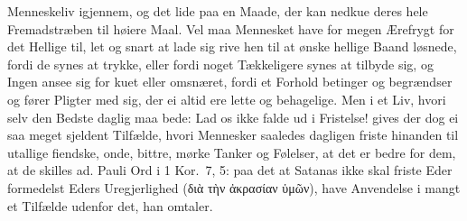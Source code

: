 \documentclass[12pt,a4paper]{book}
\begin{document}
Menneskeliv igjennem, og det lide paa en Maade, der kan nedkue deres
hele Fremadstræben til høiere Maal. Vel maa Mennesket have for megen
Ærefrygt for det Hellige til, let og snart at lade sig rive hen til at
ønske hellige Baand løsnede, fordi de synes at trykke, eller fordi noget
Tækkeligere synes at tilbyde sig, og Ingen ansee sig for kuet eller
omsnæret, fordi et Forhold betinger og begrændser og fører Pligter med
sig, der ei altid ere lette og behagelige. Men i et Liv, hvori selv den
Bedste daglig maa bede: Lad os ikke falde ud i Fristelse! gives der dog
ei saa meget sjeldent Tilfælde, hvori Mennesker saaledes dagligen friste
hinanden til utallige fiendske, onde, bittre, mørke Tanker og Følelser,
at det er bedre for dem, at de skilles ad. Pauli Ord i 1 Kor.\ 7, 5: paa
det at Satanas ikke skal friste Eder formedelst Eders Uregjerlighed (διὰ
τὴν ἀκρασίαν ὑμῶν), have Anvendelse i mangt et Tilfælde udenfor det, han
omtaler.
\end{document}
